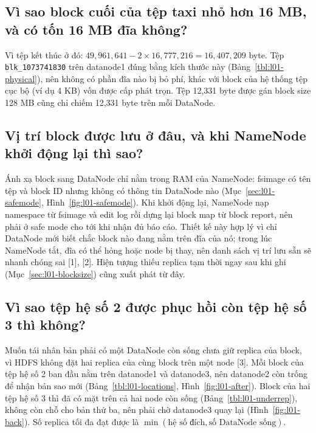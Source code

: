 \documentclass[
  12pt,
  a4paper,
]{report}
\begin{document}
\subsection{Vì sao block cuối của tệp taxi nhỏ hơn 16 MB, và có tốn 16
MB đĩa không?}\label{sec:l01-q2}

Vì tệp kết thúc ở đó:
\(49{,}961{,}641 - 2 \times 16{,}777{,}216 = 16{,}407{,}209\) byte. Tệp
\texttt{blk\_1073741830} trên datanode1 đúng bằng kích thước này
(Bảng~\ref{tbl:l01-physical}), nên không có phần đĩa nào bị bỏ phí, khác
với block của hệ thống tệp cục bộ (ví dụ 4 KB) vốn được cấp phát trọn.
Tệp 12,331 byte được gán block size 128 MB cũng chỉ chiếm 12,331 byte
trên mỗi DataNode.

\subsection{Vị trí block được lưu ở đâu, và khi NameNode khởi động lại
thì sao?}\label{sec:l01-q3}

Ánh xạ block sang DataNode chỉ nằm trong RAM của NameNode: fsimage có
tên tệp và block ID nhưng không có thông tin DataNode nào
(Mục~\ref{sec:l01-safemode}, Hình~\ref{fig:l01-safemode}). Khi khởi động
lại, NameNode nạp namespace từ fsimage và edit log rồi dựng lại block
map từ block report, nên phải ở safe mode cho tới khi nhận đủ báo cáo.
Thiết kế này hợp lý vì chỉ DataNode mới biết chắc block nào đang nằm
trên đĩa của nó; trong lúc NameNode tắt, đĩa có thể hỏng hoặc node bị
thay, nên danh sách vị trí lưu sẵn sẽ nhanh chóng sai {[}1{]}, {[}2{]}.
Hiện tượng thiếu replica tạm thời ngay sau khi ghi
(Mục~\ref{sec:l01-blocksize}) cũng xuất phát từ đây.

\subsection{Vì sao tệp hệ số 2 được phục hồi còn tệp hệ số 3 thì
không?}\label{sec:l01-q4}

Muốn tái nhân bản phải có một DataNode còn sống chưa giữ replica của
block, vì HDFS không đặt hai replica của cùng block trên một node
{[}3{]}. Mỗi block của tệp hệ số 2 ban đầu nằm trên datanode1 và
datanode3, nên datanode2 còn trống để nhận bản sao mới
(Bảng~\ref{tbl:l01-locations}, Hình~\ref{fig:l01-after}). Block của hai
tệp hệ số 3 thì đã có mặt trên cả hai node còn sống
(Bảng~\ref{tbl:l01-underrep}), không còn chỗ cho bản thứ ba, nên phải
chờ datanode3 quay lại (Hình~\ref{fig:l01-back}). Số replica tối đa đạt
được là \(\min(\text{hệ số đích}, \text{số DataNode sống})\).
\end{document}
